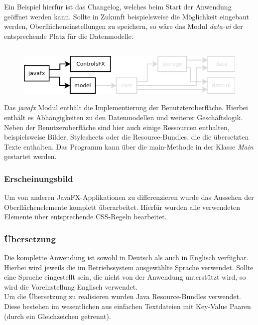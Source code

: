 Ein Beispiel hierfür ist das Changelog, welches beim Start der Anwendung geöffnet werden kann.
Sollte in Zukunft beispielsweise die Möglichkeit eingebaut werden, Oberflächeneinstellungen zu speichern, 
so wäre das Modul \textit{data-ui} der entsprechende Platz für die Datenmodelle.

\subsection{\textModJavaFX}
\label{\textModJavaFX}
\begin{figure}[h!]
	\centering
	\includegraphics[width=.8\textwidth]{module_dependencies_javafx.png}
\end{figure}

Das \textit{javafx} Modul enthält die Implementierung der Benutzteroberfläche. Hierbei enthält es Abhängigkeiten
zu den Datenmodellen und weiterer Geschäftslogik. Neben der Benutzeroberfläche sind hier auch einige Ressourcen
enthalten, beispielsweise Bilder, Stylesheets oder die Resource-Bundles, die die übersetzten Texte enthalten.
Das Programm kann über die main-Methode in der Klasse \textit{Main} gestartet werden.

\subsubsection{Erscheinungsbild}
Um \textFlowDesign{} von anderen JavaFX-Applikationen zu differenzieren wurde das Aussehen der Oberflächenelemente
komplett überarbeitet. Hierfür wurden alle verwendeten Elemente über entsprechende CSS-Regeln bearbeitet.

\subsubsection{Übersetzung}
Die komplette Anwendung ist sowohl in Deutsch als auch in Englisch verfügbar. Hierbei wird jeweils die im
Betriebssystem ausgewählte Sprache verwendet. Sollte eine Sprache eingestellt sein, die nicht von der Anwendung
unterstützt wird, so wird die Voreinstellung Englisch verwendet.\\
Um die Übersetzung zu realisieren wurden Java Resource-Bundles verwendet. Diese bestehen im wesentlichen aus
einfachen Textdateien mit Key-Value Paaren (durch ein Gleichzeichen getrennt).

